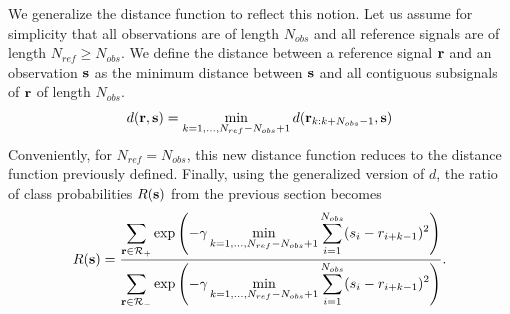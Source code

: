 We generalize the distance function to reflect this
notion. Let us assume for simplicity that all observations are of length $N_{obs}$ and
all reference signals are of length $N_{ref} \geq N_{obs}$. We define the distance between a
reference signal $\mathbf r$ and an observation $\mathbf s$ as the minimum distance
between $\mathbf s$ and all contiguous subsignals of $\mathbf r$ of length $N_{obs}$.
\begin{gather}
d(\mathbf r, \mathbf s) = \min_{k = 1, \dots, N_{ref} - N_{obs} + 1} d(\mathbf r_{k:k+N_{obs}-1}, \mathbf s)
\end{gather}
Conveniently, for $N_{ref} = N_{obs}$, this new distance function reduces to the distance
function previously defined. Finally, using the generalized version of $d$, the ratio of
class probabilities $R(\mathbf s)$ from the previous section becomes
\begin{gather}
R(\mathbf s) = \frac{\displaystyle \sum_{\mathbf r \in \mathcal{R}_+} \exp \left(-\gamma \displaystyle \min_{k = 1, \dots, N_{ref} - N_{obs} + 1} \displaystyle \sum_{i=1}^{N_{obs}} (s_i - r_{i + k - 1})^2\right)}{\displaystyle \sum_{\mathbf r \in \mathcal{R}_-} \exp \left(-\gamma \displaystyle \min_{k=1,\dots,N_{ref}-N_{obs}+1} \displaystyle \sum_{i=1}^{N_{obs}} (s_i - r_{i + k - 1})^2\right)}.
\end{gather}


